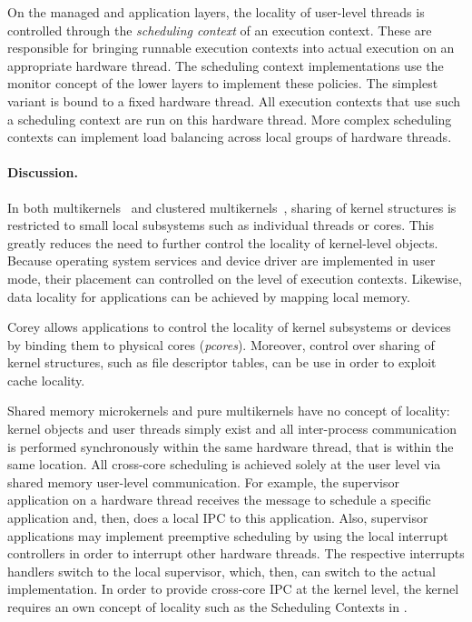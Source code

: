 On the managed and application layers, the locality of user-level threads is controlled through the \emph{scheduling context} of an execution context. These are responsible for bringing runnable execution contexts into actual execution on an appropriate hardware thread. The scheduling context implementations use the monitor concept of the lower layers to implement these policies. The simplest variant is bound to a fixed hardware thread. All execution contexts that use such a scheduling context are run on this hardware thread. More complex scheduling contexts can implement load balancing across local groups of hardware threads. 

\paragraph{Discussion.}
\hspace{0px}
In both multikernels~\cite{BAU09} and clustered multikernels~\cite{vonTessin_12}, sharing of kernel structures is restricted to small local subsystems such as individual threads or cores. This greatly reduces the need to further control the locality of kernel-level objects. 
Because operating system services and device driver are implemented in user mode, their placement can controlled on the level of execution contexts. Likewise, data locality for applications can be achieved by mapping local memory.

Corey \cite{Boyd-WickizerChenChenEtAl2008} allows applications to control the locality of kernel subsystems or devices by binding them to physical cores (\emph{pcores}). Moreover, control over sharing of kernel structures, such as file descriptor tables, can be use in order to exploit cache locality.

Shared memory microkernels and pure multikernels have no concept of locality: kernel objects and user threads simply exist and all inter-process communication is performed synchronously within the same hardware thread, that is within the same location. All cross-core scheduling is achieved solely at the user level via shared memory user-level communication. For example, the supervisor application on a hardware thread receives the message to schedule a specific application and, then, does a local IPC to this application. Also, supervisor applications may implement preemptive scheduling by using the local interrupt controllers in order to interrupt other hardware threads. The respective interrupts handlers switch to the local supervisor, which, then, can switch to the actual implementation.
In order to provide cross-core IPC at the kernel level, the kernel requires an own concept of locality such as the Scheduling Contexts in \mythos.

